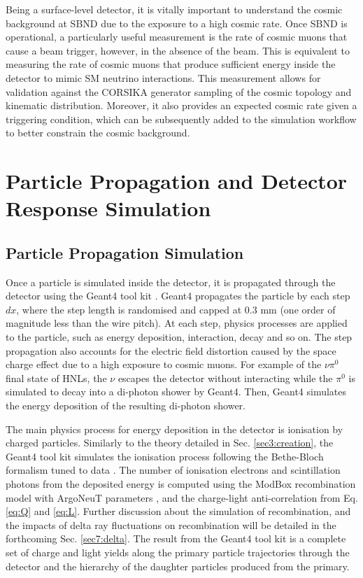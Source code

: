 Being a surface-level detector, it is vitally important to understand the cosmic background at SBND due to the exposure to a high cosmic rate.
Once SBND is operational, a particularly useful measurement is the rate of cosmic muons that cause a beam trigger, however, in the absence of the beam.
This is equivalent to measuring the rate of cosmic muons that produce sufficient energy inside the detector to mimic SM neutrino interactions.
This measurement allows for validation against the CORSIKA generator sampling of the cosmic topology and kinematic distribution. 
Moreover, it also provides an expected cosmic rate given a triggering condition, which can be subsequently added to the simulation workflow to better constrain the cosmic background.                   

\section{Particle Propagation and Detector Response Simulation}
\label{sec:gen_response}

\subsection{Particle Propagation Simulation}
\label{sec:gen_g4}

Once a particle is simulated inside the detector, it is propagated through the detector using the Geant4 tool kit \cite{geant4}.
Geant4 propagates the particle by each step $dx$, where the step length is randomised and capped at 0.3 mm (one order of magnitude less than the wire pitch).
At each step, physics processes are applied to the particle, such as energy deposition, interaction, decay and so on.
The step propagation also accounts for the electric field distortion caused by the space charge effect due to a high exposure to cosmic muons.
For example of the $\nu\pi^0$ final state of HNLs, the $\nu$ escapes the detector without interacting while the $\pi^0$ is simulated to decay into a di-photon shower by Geant4.
Then, Geant4 simulates the energy deposition of the resulting di-photon shower.

The main physics process for energy deposition in the detector is ionisation by charged particles.
Similarly to the theory detailed in Sec. \ref{sec3:creation}, the Geant4 tool kit simulates the ionisation process following the Bethe-Bloch formalism tuned to data \cite{geant4_ions}.
The number of ionisation electrons and scintillation photons from the deposited energy is computed using the ModBox recombination model with ArgoNeuT parameters \cite{argoneut_recomb}, and the charge-light anti-correlation from Eq. \ref{eq:Q} and \ref{eq:L}. 
Further discussion about the simulation of recombination, and the impacts of delta ray fluctuations on recombination will be detailed in the forthcoming Sec. \ref{sec7:delta}.
The result from the Geant4 tool kit is a complete set of charge and light yields along the primary particle trajectories through the detector and the hierarchy of the daughter particles produced from the primary.

